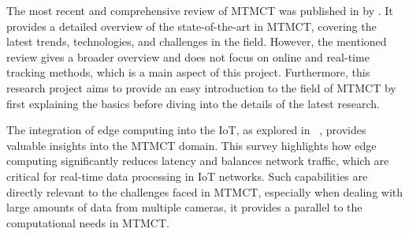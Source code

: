 The most recent and comprehensive review of MTMCT was published in \citeyear{Amosa23} by \textcite{Amosa23}. It provides a detailed overview of the state-of-the-art in MTMCT, covering the latest trends, technologies, and challenges in the field. However, the mentioned review gives a broader overview and does not focus on online and real-time tracking methods, which is a main aspect of this project. Furthermore, this research project aims to provide an easy introduction to the field of MTMCT by first explaining the basics before diving into the details of the latest research.

The integration of edge computing into the IoT, as explored in ~\cite{Yu17}, provides valuable insights into the MTMCT domain. This survey highlights how edge computing significantly reduces latency and balances network traffic, which are critical for real-time data processing in IoT networks. Such capabilities are directly relevant to the challenges faced in MTMCT, especially when dealing with large amounts of data from multiple cameras, it provides a parallel to the computational needs in MTMCT.